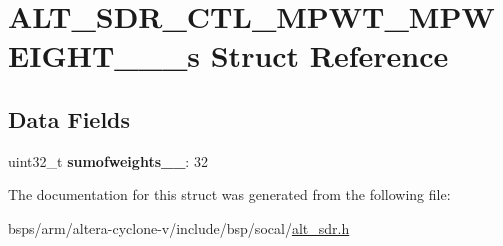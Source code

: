 \hypertarget{structALT__SDR__CTL__MPWT__MPWEIGHT__2__4__s}{}\section{A\+L\+T\+\_\+\+S\+D\+R\+\_\+\+C\+T\+L\+\_\+\+M\+P\+W\+T\+\_\+\+M\+P\+W\+E\+I\+G\+H\+T\+\_\+\_\+\_\+s Struct Reference}
\label{structALT__SDR__CTL__MPWT__MPWEIGHT__2__4__s}
\subsection*{Data Fields}
\begin{DoxyCompactItemize}
\item 
\mbox{\label{structALT__SDR__CTL__MPWT__MPWEIGHT__2__4__s_adf5142a5b53ed8862c1cd95e61b8335b}} 
uint32\+\_\+t {\bfseries sumofweights\+\_\+\_}\+: 32
\end{DoxyCompactItemize}


The documentation for this struct was generated from the following file\+:\begin{DoxyCompactItemize}
\item 
bsps/arm/altera-\/cyclone-\/v/include/bsp/socal/\mbox{\hyperlink{alt__sdr_8h}{alt\+\_\+sdr.\+h}}\end{DoxyCompactItemize}
